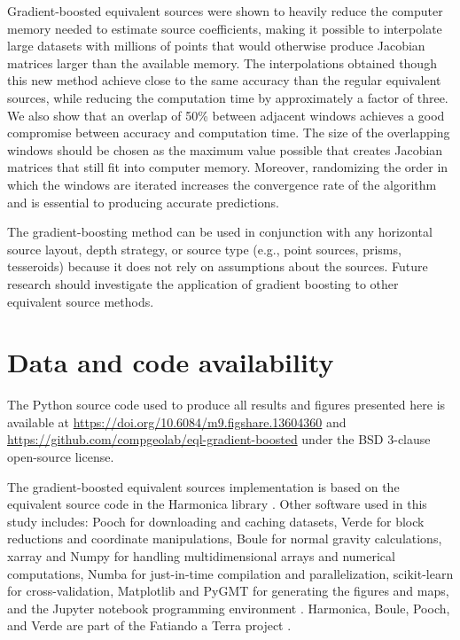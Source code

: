 Gradient-boosted equivalent sources were shown to heavily reduce the computer
memory needed to estimate source coefficients, making it possible to
interpolate large datasets with millions of points that would otherwise produce
Jacobian matrices larger than the available memory.
The interpolations obtained though this new method achieve close to the same
accuracy than the regular equivalent sources, while reducing the computation
time by approximately a factor of three.
We also show that an overlap of 50\% between adjacent windows achieves a good
compromise between accuracy and computation time.
The size of the overlapping windows should be chosen as the maximum value
possible that creates Jacobian matrices that still fit into computer memory.
Moreover, randomizing the order in which the windows are iterated increases the
convergence rate of the algorithm and is essential to producing accurate
predictions.

The gradient-boosting method can be used in conjunction with any horizontal
source layout, depth strategy, or source type (e.g., point sources, prisms,
tesseroids) because it does not rely on assumptions about the sources.
Future research should investigate the application of gradient boosting to
other equivalent source methods.


\section{Data and code availability}

The Python source code used to produce all results and figures presented here
is available at
\url{https://doi.org/10.6084/m9.figshare.13604360} and
\url{https://github.com/compgeolab/eql-gradient-boosted}
under the BSD 3-clause open-source license.

The gradient-boosted equivalent sources implementation is based on the
equivalent source code in the Harmonica library \citep{harmonica2021}.
Other software used in this study includes:
Pooch \citep{pooch2020} for downloading and caching datasets,
Verde \citep{verde2018} for block reductions and coordinate manipulations,
Boule \citep{boule2020} for normal gravity calculations,
xarray \citep{xarray2017} and Numpy \citep{numpy2020} for handling
multidimensional arrays and numerical computations,
Numba \citep{numba2015} for just-in-time compilation and parallelization,
scikit-learn \citep{sklearn2011} for cross-validation,
Matplotlib \citep{matplotlib2007} and PyGMT \citep{pygmt2020} for generating
the figures and maps,
and the Jupyter notebook programming environment \citep{jupyter2016}.
Harmonica, Boule, Pooch, and Verde are part of the Fatiando a Terra project
\citep{fatiando2013}.

